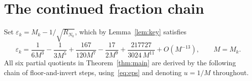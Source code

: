 \documentclass[12pt]{amsart}
\theoremstyle{definition}
\begin{document}
\section{The continued fraction chain}\label{sec:chain}

Set $\varepsilon_k = M_k - 1/\sqrt{R_{N_k}}$, which by
Lemma~\ref{lem:key} satisfies
\begin{equation}\label{eq:eps}
  \varepsilon_k = \frac{1}{6M^3} - \frac{1}{3M^5} + \frac{167}{120M^7}
                - \frac{17}{2M^9} + \frac{217727}{3024\,M^{11}} + O(M^{-13}),
  \qquad M = M_k.
\end{equation}
All six partial quotients in Theorem~\ref{thm:main} are derived by
the following chain of floor-and-invert steps, using~\eqref{eq:eps} and
denoting $u = 1/M$ throughout.
\end{document}
